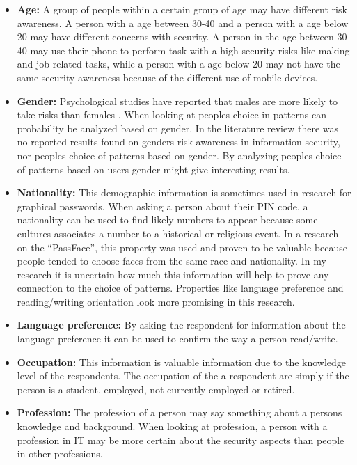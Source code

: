   \begin{itemize}
    \item {\bf Age:} A group of people within a certain group of age may have different risk awareness. A person with a age between 30-40 and a person with a age below 20 may have different concerns with security. A person in the age between 30-40 may use their phone to perform task with a high security risks like making and job related tasks, while a person with a age below 20 may not have the same security awareness because of the different use of mobile devices.
    \item {\bf Gender:} Psychological studies have reported that males are more likely to take risks than females \cite{Byrnes}. When looking at peoples choice in patterns can probability be analyzed based on gender. In the literature review there was no reported results found on genders risk awareness in information security, nor peoples choice of patterns based on gender. By analyzing peoples choice of patterns based on users gender might give interesting results. 
    \item {\bf Nationality:} This demographic information is sometimes used in research for graphical passwords. When asking a person about their PIN code, a nationality can be used to find likely numbers to appear because some cultures associates a number to a historical or religious event. In a research on the ``PassFace'', this property was used and proven to be valuable because people tended to choose faces from the same race and nationality. In my research it is uncertain how much this information will help to prove any connection to the choice of patterns. Properties like language preference and reading/writing orientation look more promising in this research.
    \item {\bf Language preference:} By asking the respondent for information about the language preference it can be used to confirm the way a person read/write.
    \item{\bf Occupation:} This information is valuable information due to the knowledge level of the respondents. The occupation of the a respondent are simply if the person is a student, employed, not currently employed or retired.
    \item {\bf Profession:} The profession of a person may say something about a persons knowledge and background. When looking at profession, a person with a profession in IT may be more certain about the security aspects than people in other professions. 

\end{itemize}
